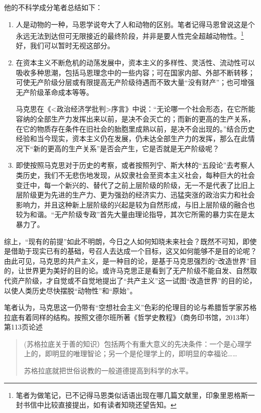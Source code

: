 他的不科学成分笔者总结如下：
\begin{enumerate}
\item 人是动物的一种，马恩学说夸大了人和动物的区别。笔者记得马恩曾说这是个永远无法到达但可无限接近的最终阶段，并非是要人性完全超越动物性。\footnote{笔者为做笔记，已不记得马恩类似话语出现在哪几篇文献里，印象里恩格斯一封书信中比较直接提出，如有读者知晓还望告知。}好，我们可以暂时无视这部分。

\item 在资本主义不断危机的动荡发展中，资本主义的多样性、灵活性、流动性可以吸收多种思潮，包括马恩理念中的一些内容；可在国家内部、外部不断转移；可使无产阶级分层或有限提高无产阶级待遇而不致大量“没有财产”；也可增强无产阶级革命成本等等。

  马克思在《<政治经济学批判>序言》中说：“无论哪一个社会形态，在它所能容纳的全部生产力发挥出来以前，是决不会灭亡的；而新的更高的生产关系，在它的物质存在条件在旧社会的胎胞里成熟以前，是决不会出现的。”结合历史经验和当今现实，资本主义仍在发展，仍未达全部生产力的发挥，那么在此情况下“新的更高的生产关系”是否会产生，它是否就是无产阶级呢？

\item 即使按照马克思对于历史的考察，或者按照列宁、斯大林的“五段论”去考察人类历史，我们不无悲伤地发现，从奴隶社会至资本主义社会，每种巨大的社会变迁中，每一个新兴的、替代了之前上层阶级的阶级，无一不是代表了比旧上层阶级更为先进的生产力、更为强劲的经济实力、迅猛突涨的政治实力和社会影响力，并且这种新上层阶级的兴起是较为自然形成，与旧上层阶级的融合也较为和谐。“无产阶级专政”首先大量由理论指导，其次它所需的暴力实在是太暴力了。
\end{enumerate}

综上，“现有的前提”如此不明朗，今日之人如何知晓未来社会？既然不可知，即使是借助于现实已有的基础，号召人去达成一个目标，这又如何能够不是目的论呢？由此可见，马克思的共产主义，是一种目的论，是基于马克思强烈的“改造世界”目的，让世界更为美好的目的论。或许马克思正是看到了无产阶级不能自发、自然取代资产阶级，才自觉或不自觉地提出了“共产主义”这一试图“改造世界”的目的论，以使人类历史尽快摆脱“动物性”和“原始”。

笔者认为，马克思这一仍带有“空想社会主义”色彩的伦理目的论与希腊哲学家苏格拉底有着同样的结构。按照文德尔班所著《哲学史教程》（商务印书馆，2013年）第113页论述
\begin{quotation} (苏格拉底关于善的知识）包括两个有重大意义的先决条件：一个是心理学上的，即明显的唯理智论；另一个是伦理学上的，即明显的幸福论……

  苏格拉底就把世俗说教的一般道德提高到科学的水平。
\end{quotation}

